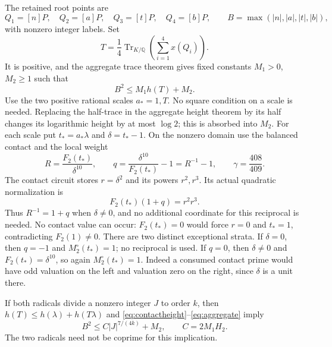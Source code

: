 \documentclass[11pt,a4paper]{article}
\newcommand{\Q}{\mathbb Q}\newcommand{\Z}{\mathbb Z}\newcommand{\HH}{\mathcal H}
\DeclareMathOperator{\Tr}{Tr}\DeclareMathOperator{\Nm}{Nm}
\begin{document}
The retained root points are
\[
 Q_1=[n]P,\quad Q_2=[a]P,\quad Q_3=[t]P,\quad Q_4=[b]P,
 \qquad B=\max(|n|,|a|,|t|,|b|),
\]
with nonzero integer labels. Set
\[
 T=\frac14\Tr_{K/\Q}\left(\sum_{i=1}^4x(Q_i)\right).
\]
It is positive, and the aggregate trace theorem gives fixed constants
$M_1>0$, $M_2\ge1$ such that
\begin{equation}\label{eq:aggregate}
                         B^2\le M_1h(T)+M_2.
\end{equation}
Use the two positive rational scales $a_*=1,T$. No square condition
on a scale is needed. Replacing the half-trace in the aggregate
height theorem by its half changes its logarithmic height by at
most $\log2$; this is absorbed into $M_2$.
For each scale put $t_*=a_*\lambda$ and $\delta=t_*-1$.
On the nonzero domain use the balanced contact and the local weight
\begin{equation}\label{eq:detector}
 R=\frac{F_2(t_*)}{\delta^{10}},\qquad
 q=\frac{\delta^{10}}{F_2(t_*)}-1=R^{-1}-1,
 \qquad \gamma=\frac{408}{409}.
\end{equation}
The contact circuit stores $r=\delta^2$ and its powers $r^2,r^3$.
Its actual quadratic normalization is
\begin{equation}\label{eq:clearing}
                         F_2(t_*)(1+q)=r^2r^3.
\end{equation}
Thus $R^{-1}=1+q$ when $\delta\ne0$, and no additional coordinate
for this reciprocal is needed. No contact value can occur:
$F_2(t_*)=0$ would force $r=0$ and $t_*=1$, contradicting $F_2(1)\ne0$.
There are two distinct exceptional strata. If $\delta=0$, then $q=-1$
and $M_2^\circ(t_*)=1$; no reciprocal is used. If $q=0$, then $\delta\ne0$
and $F_2(t_*)=\delta^{10}$, so again $M_2^\circ(t_*)=1$. Indeed a consumed
contact prime would have odd valuation on the left and valuation zero
on the right, since $\delta$ is a unit there.

If both radicals divide a nonzero integer $J$ to order $k$, then
$h(T)\le h(\lambda)+h(T\lambda)$ and
\eqref{eq:contactheight}--\eqref{eq:aggregate} imply
\begin{equation}\label{eq:heighttransfer}
 B^2\le C|J|^{7/(4k)}+M_2,\qquad C=2M_1H_2.
\end{equation}
The two radicals need not be coprime for this implication.
\end{document}
